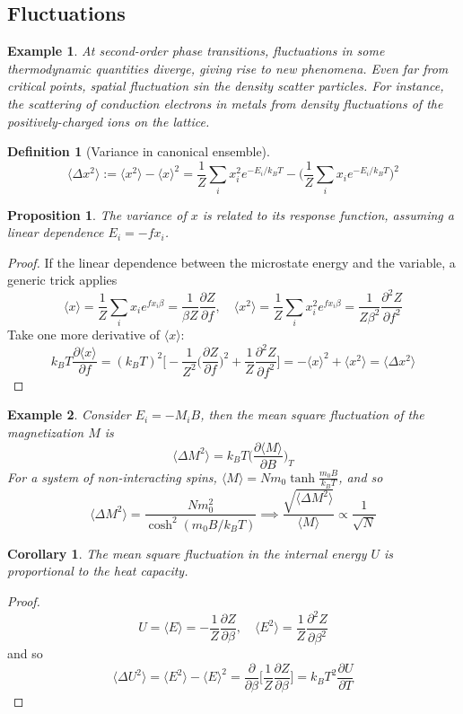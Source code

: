 \documentclass[a4paper]{article}
\newtheorem{eg}{Example}[section]
\theoremstyle{new}
\newtheorem{defi}{Definition}[section]
\newtheorem{prop}{Proposition}[section]
\newtheorem{cor}{Corollary}[section]
\begin{document}
\subsection{Fluctuations}
\begin{eg}
At second-order phase transitions, fluctuations in some thermodynamic quantities diverge, giving rise to new phenomena. Even far from critical points, spatial fluctuation sin the density scatter particles. For instance, the scattering of conduction electrons in metals from density fluctuations of the positively-charged ions on the lattice.
\end{eg}
\begin{defi}[Variance in canonical ensemble]
$$\langle\Delta x^2\rangle:=\langle x^2\rangle-\langle x\rangle^2=\frac{1}{Z}\sum_ix_i^2e^{-E_i/k_BT}-\bigg(\frac{1}{Z}\sum_i x_ie^{-E_i/k_BT}\bigg)^2$$
\end{defi}
\begin{prop}
The variance of $x$ is related to its response function, assuming a linear dependence $E_i=-fx_i$.
\end{prop}
\begin{proof}
If the linear dependence between the microstate energy and the variable, a generic trick applies
$$\langle x\rangle=\frac{1}{Z}\sum_ix_ie^{fx_i\beta}=\frac{1}{\beta Z}\frac{\partial Z}{\partial f},\quad\langle x^2\rangle=\frac{1}{Z}\sum_ix_i^2e^{fx_i\beta}=\frac{1}{Z\beta^2}\frac{\partial^2Z}{\partial f^2}$$
Take one more derivative of $\langle x\rangle$:
$$k_BT\frac{\partial\langle x\rangle}{\partial f}=(k_BT)^2\bigg[-\frac{1}{Z^2}\bigg(\frac{\partial Z}{\partial f}\bigg)^2+\frac{1}{Z}\frac{\partial^2Z}{\partial f^2}\bigg]=-\langle x\rangle^2+\langle x^2\rangle=\langle\Delta x^2\rangle$$
\end{proof}
\begin{eg}
Consider $E_i=-M_iB$, then the mean square fluctuation of the magnetization $M$ is
$$\langle\Delta M^2\rangle=k_BT\bigg(\frac{\partial\langle M\rangle}{\partial B}\bigg)_T$$
For a system of non-interacting spins, $\langle M\rangle=Nm_0\tanh\frac{m_0B}{k_BT}$, and so
$$\langle\Delta M^2\rangle=\frac{Nm_0^2}{\cosh^2(m_0B/k_BT)}\implies\frac{\sqrt{\langle\Delta M^2\rangle}}{\langle M\rangle}\propto\frac{1}{\sqrt{N}}$$
\end{eg}
\begin{cor}
The mean square fluctuation in the internal energy $U$ is proportional to the heat capacity.
\end{cor}
\begin{proof}
$$U=\langle E\rangle=-\frac{1}{Z}\frac{\partial Z}{\partial\beta},\quad\langle E^2\rangle=\frac{1}{Z}\frac{\partial^2Z}{\partial\beta^2}$$
and so
$$\langle\Delta U^2\rangle=\langle E^2\rangle-\langle E\rangle^2=\frac{\partial}{\partial\beta}\bigg[\frac{1}{Z}\frac{\partial Z}{\partial\beta}\bigg]=k_BT^2\frac{\partial U}{\partial T}$$
\end{proof}
\end{document}
